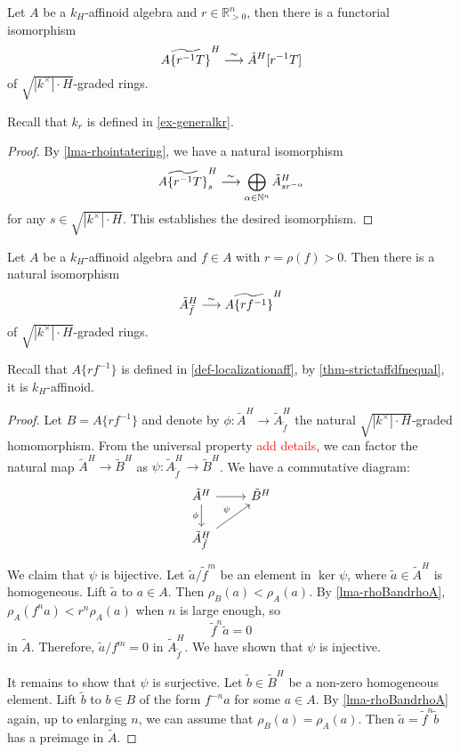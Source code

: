 \begin{proposition}\label{prop-gradedredtate}
    Let $A$ be a $k_H$-affinoid algebra and $r\in \mathbb{R}^n_{>0}$, then there is a functorial isomorphism
    \[
        \widetilde{A\{r^{-1}T\}}^H \stackrel{\sim}{\longrightarrow} \tilde{A}^H[r^{-1}T]
    \]
    of $\sqrt{|k^{\times}|\cdot H}$-graded rings.
\end{proposition}
Recall that $k_r$ is defined in \cref{ex-generalkr}.
\begin{proof}
    By \cref{lma-rhointatering}, we have a natural isomorphism
    \[
        \widetilde{A\{r^{-1}T\}}^H_s \stackrel{\sim}{\longrightarrow} \bigoplus_{\alpha\in \mathbb{N}^n} \tilde{A}^H_{s r^{-\alpha}}  
    \]
    for any $s\in \sqrt{|k^{\times}|\cdot H}$. This establishes the desired isomorphism.
\end{proof}

\begin{proposition}\label{prop:localatoneelementreduction}
    Let $A$ be a $k_H$-affinoid algebra and $f\in A$ with $r=\rho(f)>0$. Then there is a natural isomorphism
    \[
        \tilde{A}^H_{\tilde{f}}\stackrel{\sim}{\longrightarrow} \widetilde{A\{rf^{-1}\}}^H
    \]
    of $\sqrt{|k^{\times}|\cdot H}$-graded rings.
\end{proposition}
Recall that $A\{rf^{-1}\}$ is defined in \cref{def-localizationaff}, by \cref{thm-strictaffdfnequal}, it is $k_H$-affinoid.
\begin{proof}

    Let $B=A\{rf^{-1}\}$ and denote by $\phi:\tilde{A}^H\rightarrow \tilde{A}_{\tilde{f}}^H$ the natural  $\sqrt{|k^{\times}|\cdot H}$-graded homomorphism. From the universal property \textcolor{red}{add details}, we can factor the natural map $\tilde{A}^H\rightarrow \tilde{B}^H$ as $\psi:\tilde{A}_{\tilde{f}}^H\rightarrow \tilde{B}^H$. We have a commutative diagram:
    \[
        \begin{tikzcd}
            \tilde{A}^H \arrow[r] \arrow[d, "\phi"']   & \tilde{B}^H \\
            \tilde{A}^H_{\tilde{f}} \arrow[ru, "\psi"] &          
        \end{tikzcd}
    \]
    We claim that $\psi$ is bijective.
    Let $\tilde{a}/\tilde{f}^m$ be an element in $\ker \psi$, where $\tilde{a}\in \tilde{A}^H$ is homogeneous. Lift $\tilde{a}$ to $a\in A$. Then $\rho_B(a)<\rho_A(a)$. By \cref{lma-rhoBandrhoA}, $\rho_A(f^na)<r^n\rho_A(a)$ when $n$ is large enough, so 
    \[
        \tilde{f}^n\tilde{a}=0  
    \]
    in $\tilde{A}$. Therefore, $\tilde{a}/f^m=0$ in $\tilde{A}^H_{\tilde{f}}$. We have shown that $\psi$ is injective.

    It remains to show that $\psi$ is surjective. Let $\tilde{b}\in \tilde{B}^H$ be a non-zero homogeneous element. Lift $\tilde{b}$ to $b\in B$ of the form $f^{-n}a$ for some $a\in A$. By \cref{lma-rhoBandrhoA} again, up to enlarging $n$, we can assume that $\rho_B(a)=\rho_A(a)$. Then $\tilde{a}=\tilde{f}^n\tilde{b}$ has a preimage in $\tilde{A}$. 

\end{proof}

